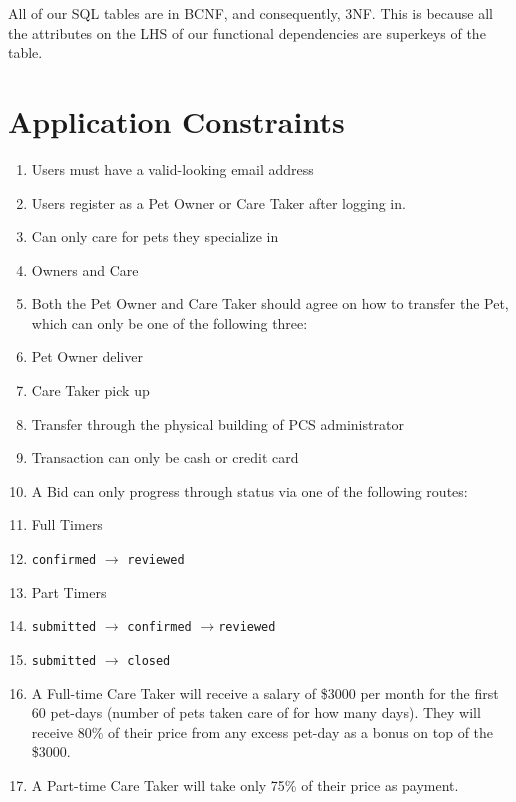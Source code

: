 \documentclass[
  paper=a4,
  ,captions=tableheading
]{scrartcl}
\newcommand{\passthrough}[1]{#1}
\providecommand{\tightlist}{%
  \setlength{\itemsep}{0pt}\setlength{\parskip}{0pt}}
\begin{document}
All of our SQL tables are in BCNF, and consequently, 3NF. This is
because all the attributes on the LHS of our functional dependencies are
superkeys of the table.

\hypertarget{application-constraints}{%
\section{Application Constraints}\label{application-constraints}}

\begin{enumerate}
\def\labelenumi{\arabic{enumi}.}
\tightlist
\item
  Users must have a valid-looking email address
\item
  Users register as a Pet Owner or Care Taker after logging in.
\item
  Can only care for pets they specialize in
\item
  Owners and Care
\item
  Both the Pet Owner and Care Taker should agree on how to transfer the
  Pet, which can only be one of the following three:
\item
  Pet Owner deliver
\item
  Care Taker pick up
\item
  Transfer through the physical building of PCS administrator
\item
  Transaction can only be cash or credit card
\item
  A Bid can only progress through status via one of the following
  routes:
\item
  Full Timers
\item
  \passthrough{\lstinline!confirmed!} \(\rightarrow\)
  \passthrough{\lstinline!reviewed!}
\item
  Part Timers
\item
  \passthrough{\lstinline!submitted!} \(\rightarrow\)
  \passthrough{\lstinline!confirmed!}
  \(\rightarrow\)\passthrough{\lstinline!reviewed!}
\item
  \passthrough{\lstinline!submitted!} \(\rightarrow\)
  \passthrough{\lstinline!closed!}
\item
  A Full-time Care Taker will receive a salary of \$3000 per month for
  the first 60 pet-days (number of pets taken care of for how many
  days). They will receive 80\% of their price from any excess pet-day
  as a bonus on top of the \$3000.
\item
  A Part-time Care Taker will take only 75\% of their price as payment.
\end{enumerate}
\end{document}

